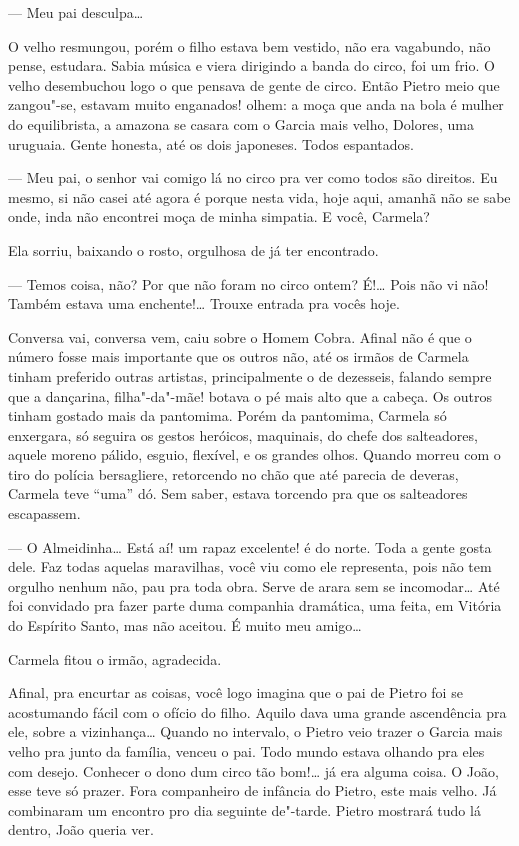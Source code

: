 \begin{linenumbers}
--- Meu pai desculpa\ldots{}

O velho resmungou, porém o filho estava bem vestido, não era vagabundo,
não pense, estudara. Sabia música e viera dirigindo a banda do circo,
foi um frio. O velho desembuchou logo o que pensava de gente de circo.
Então Pietro meio que zangou"-se, estavam muito enganados! olhem: a moça
que anda na bola é mulher do equilibrista, a amazona se casara com o
Garcia mais velho, Dolores, uma uruguaia. Gente honesta, até os dois
japoneses. Todos espantados.

--- Meu pai, o senhor vai comigo lá no circo pra ver como todos são
direitos. Eu mesmo, si não casei até agora é porque nesta vida, hoje
aqui, amanhã não se sabe onde, inda não encontrei moça de minha
simpatia. E você, Carmela?

Ela sorriu, baixando o rosto, orgulhosa de já ter encontrado.

--- Temos coisa, não? Por que não foram no circo ontem? É!\ldots{} Pois não
vi não! Também estava uma enchente!\ldots{} Trouxe entrada pra vocês hoje.

Conversa vai, conversa vem, caiu sobre o Homem Cobra. Afinal não é que o
número fosse mais importante que os outros não, até os irmãos de Carmela
tinham preferido outras artistas, principalmente o de dezesseis, falando
sempre que a dançarina, filha"-da"-mãe! botava o pé mais alto que a
cabeça. Os outros tinham gostado mais da pantomima. Porém da pantomima,
Carmela só enxergara, só seguira os gestos heróicos, maquinais, do chefe
dos salteadores, aquele moreno pálido, esguio, flexível, e os grandes
olhos. Quando morreu com o tiro do polícia bersagliere, retorcendo no
chão que até parecia de deveras, Carmela teve ``uma'' dó. Sem saber,
estava torcendo pra que os salteadores escapassem.

--- O Almeidinha\ldots{} Está aí! um rapaz excelente! é do norte. Toda a
gente gosta dele. Faz todas aquelas maravilhas, você viu como ele
representa, pois não tem orgulho nenhum não, pau pra toda obra. Serve de
arara sem se incomodar\ldots{} Até foi convidado pra fazer parte duma
companhia dramática, uma feita, em Vitória do Espírito Santo, mas não
aceitou. É muito meu amigo\ldots{}

Carmela fitou o irmão, agradecida.

Afinal, pra encurtar as coisas, você logo imagina que o pai de Pietro
foi se acostumando fácil com o ofício do filho. Aquilo dava uma grande
ascendência pra ele, sobre a vizinhança\ldots{} Quando no intervalo, o Pietro
veio trazer o Garcia mais velho pra junto da família, venceu o pai. Todo
mundo estava olhando pra eles com desejo. Conhecer o dono dum circo tão
bom!\ldots{} já era alguma coisa. O João, esse teve só prazer. Fora
companheiro de infância do Pietro, este mais velho. Já combinaram um
encontro pro dia seguinte de"-tarde. Pietro mostrará tudo lá dentro, João
queria ver. 


\end{linenumbers}
